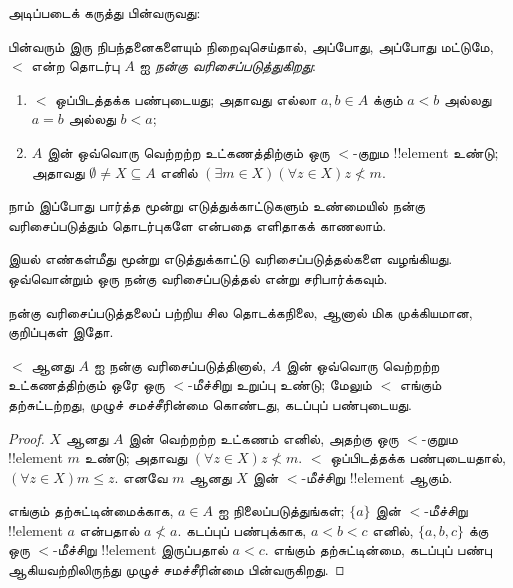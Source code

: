\documentclass[../../../include/open-logic-section]{subfiles}
\begin{document}

அடிப்படைக் கருத்து பின்வருவது:

\begin{defn}
பின்வரும் இரு நிபந்தனைகளையும் நிறைவுசெய்தால், அப்போது, அப்போது மட்டுமே,
$<$ என்ற தொடர்பு $A$ ஐ \emph{நன்கு வரிசைப்படுத்துகிறது}:
\begin{enumerate}
	\item $<$ ஒப்பிடத்தக்க பண்புடையது; அதாவது எல்லா $a, b \in A$
	க்கும் $a < b$ அல்லது $a = b$ அல்லது $b < a$;
	\item $A$ இன் ஒவ்வொரு வெற்றற்ற உட்கணத்திற்கும் ஒரு $<$-குறும
	!!{element} உண்டு; அதாவது $\emptyset \neq X \subseteq A$ எனில்
	$(\exists m \in X)(\forall z \in X)z \nless m$.
\end{enumerate}
\end{defn}

நாம் இப்போது பார்த்த மூன்று எடுத்துக்காட்டுகளும் உண்மையில் நன்கு
வரிசைப்படுத்தும் தொடர்புகளே என்பதை எளிதாகக் காணலாம்.

\begin{prob}
 இயல் எண்கள்மீது மூன்று எடுத்துக்காட்டு
வரிசைப்படுத்தல்களை வழங்கியது. ஒவ்வொன்றும் ஒரு நன்கு வரிசைப்படுத்தல் என்று
சரிபார்க்கவும்.
\end{prob}

நன்கு வரிசைப்படுத்தலைப் பற்றிய சில தொடக்கநிலை, ஆனால் மிக முக்கியமான,
குறிப்புகள் இதோ.

\begin{prop}
$<$ ஆனது $A$ ஐ நன்கு வரிசைப்படுத்தினால், $A$ இன் ஒவ்வொரு வெற்றற்ற
உட்கணத்திற்கும் ஒரே ஒரு $<$-மீச்சிறு உறுப்பு உண்டு; மேலும் $<$ எங்கும்
தற்சுட்டற்றது, முழுச் சமச்சீரின்மை கொண்டது, கடப்புப் பண்புடையது.
\end{prop}

\begin{proof}
$X$ ஆனது $A$ இன் வெற்றற்ற உட்கணம் எனில், அதற்கு ஒரு $<$-குறும
!!{element} $m$ உண்டு; அதாவது $(\forall z \in X)z \nless m$.
$<$ ஒப்பிடத்தக்க பண்புடையதால், $(\forall z \in X)m \leq z$.
எனவே $m$ ஆனது $X$ இன் $<$-மீச்சிறு !!{element} ஆகும்.

எங்கும் தற்சுட்டின்மைக்காக, $a \in A$ ஐ நிலைப்படுத்துங்கள்;
$\{a\}$ இன் $<$-மீச்சிறு !!{element} $a$ என்பதால் $a \nless a$.
கடப்புப் பண்புக்காக, $a < b < c$ எனில், $\{a, b, c\}$ க்கு ஒரு
$<$-மீச்சிறு !!{element} இருப்பதால் $a < c$. எங்கும் தற்சுட்டின்மை,
கடப்புப் பண்பு ஆகியவற்றிலிருந்து முழுச் சமச்சீரின்மை பின்வருகிறது.
\end{proof}
\end{document}
